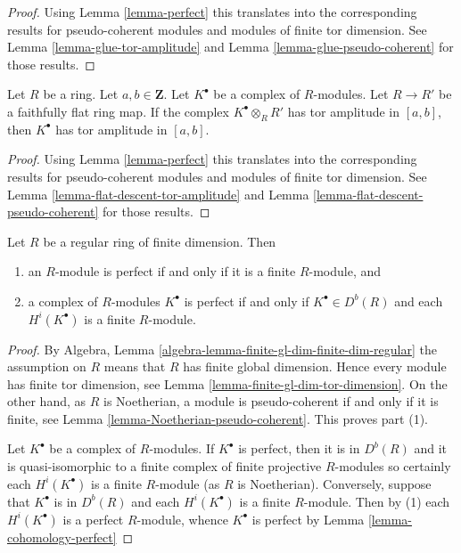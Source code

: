 \begin{proof}
Using
Lemma \ref{lemma-perfect}
this translates into the corresponding results for pseudo-coherent modules
and modules of finite tor dimension. See
Lemma \ref{lemma-glue-tor-amplitude}
and
Lemma \ref{lemma-glue-pseudo-coherent}
for those results.
\end{proof}

\begin{lemma}
\label{lemma-flat-descent-perfect}
Let $R$ be a ring. Let $a, b \in \mathbf{Z}$. Let $K^\bullet$
be a complex of $R$-modules. Let $R \to R'$ be a faithfully flat
ring map. If the complex $K^\bullet \otimes_R R'$ has tor amplitude
in $[a, b]$, then $K^\bullet$ has tor amplitude in $[a, b]$.
\end{lemma}

\begin{proof}
Using
Lemma \ref{lemma-perfect}
this translates into the corresponding results for pseudo-coherent modules
and modules of finite tor dimension. See
Lemma \ref{lemma-flat-descent-tor-amplitude}
and
Lemma \ref{lemma-flat-descent-pseudo-coherent}
for those results.
\end{proof}

\begin{lemma}
\label{lemma-regular-perfect}
Let $R$ be a regular ring of finite dimension. Then
\begin{enumerate}
\item an $R$-module is perfect if and only if it is a finite $R$-module, and
\item a complex of $R$-modules $K^\bullet$ is perfect if and only
if $K^\bullet \in D^b(R)$ and each $H^i(K^\bullet)$ is a finite $R$-module.
\end{enumerate}
\end{lemma}

\begin{proof}
By
Algebra, Lemma \ref{algebra-lemma-finite-gl-dim-finite-dim-regular}
the assumption on $R$ means that $R$ has finite global dimension.
Hence every module has finite tor dimension, see
Lemma \ref{lemma-finite-gl-dim-tor-dimension}.
On the other hand, as $R$ is Noetherian, a module is pseudo-coherent
if and only if it is finite, see
Lemma \ref{lemma-Noetherian-pseudo-coherent}.
This proves part (1).

\medskip\noindent
Let $K^\bullet$ be a complex of $R$-modules.
If $K^\bullet$ is perfect, then it is in $D^b(R)$ and it is
quasi-isomorphic to a finite complex of finite projective $R$-modules
so certainly each $H^i(K^\bullet)$ is a finite $R$-module (as $R$ is
Noetherian). Conversely, suppose that $K^\bullet$ is in $D^b(R)$
and each $H^i(K^\bullet)$ is a finite $R$-module. Then by (1) each
$H^i(K^\bullet)$ is a perfect $R$-module, whence $K^\bullet$ is
perfect by
Lemma \ref{lemma-cohomology-perfect}
\end{proof}

